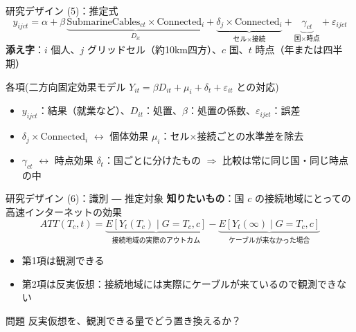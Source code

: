 \documentclass[aspectratio=169,11pt]{beamer}
\begin{document}
\begin{frame}{研究デザイン (5)：推定式}
  \[
    y_{ijct} = \alpha + \beta\,\underbrace{\text{SubmarineCables}_{ct}\times\text{Connected}_i}_{D_{it}}
    + \underbrace{\delta_j\times\text{Connected}_i}_{\text{セル}\times\text{接続}}
    + \underbrace{\gamma_{ct}}_{\text{国}\times\text{時点}} + \varepsilon_{ijct}
  \]
  \small
  \textbf{添え字}：$i$ 個人、$j$ グリッドセル（約10km四方）、$c$ 国、$t$ 時点（年または四半期）
  \vspace{0.6em}

      \begin{block}{各項(二方向固定効果モデル $Y_{it}=\beta D_{it}+\mu_i+\delta_t+\varepsilon_{it}$ との対応)}
        \small
        \begin{itemize}
          \item $y_{ijct}$：結果（就業など）、$D_{it}$：処置、$\beta$：処置の係数、$\varepsilon_{ijct}$：誤差
          \item $\delta_j\times\text{Connected}_i$ $\leftrightarrow$ \alert{個体効果} $\mu_i$：セル$\times$接続ごとの水準差を除去
          \item $\gamma_{ct}$ $\leftrightarrow$ \alert{時点効果} $\delta_t$：国ごとに分けたもの
                $\Rightarrow$ 比較は常に\alert{同じ国・同じ時点の中}
        \end{itemize}
      \end{block}
\end{frame}

\begin{frame}{研究デザイン (6)：識別 ― 推定対象}
  \textbf{知りたいもの}：国 $c$ の接続地域にとっての高速インターネットの効果
  \[
    ATT(T_c,t) = \underbrace{E[Y_t(T_c)\mid G=T_c,c]}_{\text{接続地域の実際のアウトカム}}
    - \underbrace{E[Y_t(\infty)\mid G=T_c,c]}_{\text{ケーブルが来なかった場合}}
  \]
  \vspace{0.5em}
  \begin{itemize}
    \item 第1項は観測できる
    \item 第2項は\alert{反実仮想}：接続地域には実際にケーブルが来ているので観測できない
  \end{itemize}
  \vspace{0.8em}
  \begin{block}{問題}
    反実仮想を、観測できる量でどう置き換えるか？
  \end{block}
\end{frame}
\end{document}
